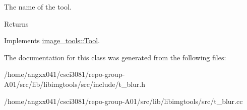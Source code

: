 The name of the tool. 

\begin{DoxyReturn}{Returns}

\end{DoxyReturn}


Implements \hyperlink{classimage__tools_1_1Tool_a251c179e3ac9756d08fbcd082750f8a9}{image\+\_\+tools\+::\+Tool}.



The documentation for this class was generated from the following files\+:\begin{DoxyCompactItemize}
\item 
/home/angxx041/csci3081/repo-\/group-\/\+A01/src/lib/libimgtools/src/include/t\+\_\+blur.\+h\item 
/home/angxx041/csci3081/repo-\/group-\/\+A01/src/lib/libimgtools/src/t\+\_\+blur.\+cc\end{DoxyCompactItemize}
